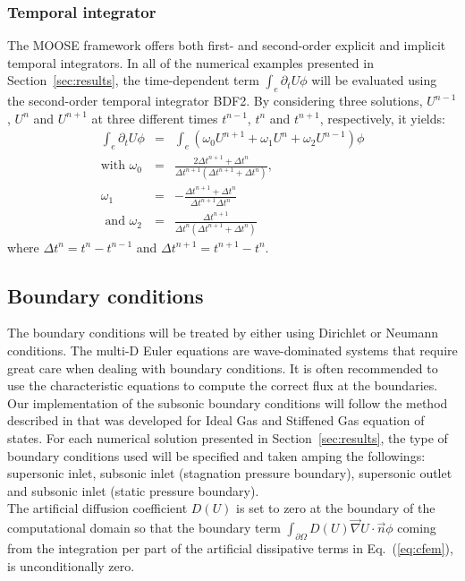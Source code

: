 \documentclass[preprint,10pt]{elsarticle}
\newcommand{\grad}{\vec{\nabla}}
\newcommand{\eqt}[1]{Eq.~(\ref{#1})}                     %
\newcommand{\sct}[1]{Section~\ref{#1}}                   %
\begin{document}
\subsubsection{Temporal integrator} 
The MOOSE framework offers both first- and second-order explicit and implicit temporal integrators. In all of the numerical examples presented in \sct{sec:results}, the time-dependent term $\int_{e} \partial_t U \phi$ will be evaluated using the second-order temporal integrator BDF2. By considering three solutions, $U^{n-1}$, $U^n$ and $U^{n+1}$ at three different times $t^{n-1}$, $t^n$ and $t^{n+1}$, respectively, it yields:
\begin{eqnarray}
\label{eq:BDF2}
\int_{e} \partial_t U \phi &=& \int_{e} \left( \omega_0 U^{n+1}  + \omega_1 U^n + \omega_2 U^{n-1} \right) \phi\\
\text{with }\omega_0 &=&\frac{2\Delta t^{n+1}+\Delta t^n}{\Delta t^{n+1} \left( \Delta t^{n+1}+\Delta t^n \right)} \text{, } \nonumber \\
\omega_1 &=& -\frac{\Delta t^{n+1}+\Delta t^n}{\Delta t^{n+1} \Delta t^n}\nonumber \\
\text{ and } \omega_2 &=& \frac{\Delta t^{n+1}}{\Delta t^n \left( \Delta t^{n+1} + \Delta t^n \right)} \nonumber
\end{eqnarray}
where $\Delta t^{n} = t^n-t^{n-1}$ and $\Delta t^{n+1} = t^{n+1}-t^{n}$.
\subsection{Boundary conditions} \label{sec:bc}
The boundary conditions will be treated by either using Dirichlet or Neumann conditions. The multi-D Euler equations are wave-dominated systems that require great care when dealing with boundary conditions. It is often recommended to use the characteristic equations to compute the correct flux at the boundaries. Our implementation of the subsonic boundary conditions will follow the method described in \cite{SEM} that was developed for Ideal Gas and Stiffened Gas equation of states. For each numerical solution presented in \sct{sec:results}, the type of boundary conditions used will be specified and taken amping the followings: supersonic inlet, subsonic inlet (stagnation pressure boundary), supersonic outlet and subsonic inlet (static pressure boundary). \\
The artificial diffusion coefficient $D(U)$ is set to zero at the boundary of the computational domain so that the boundary term $\int_{\partial \Omega} D(U) \grad U \cdot \vec{n} \phi$ coming from the integration per part of the artificial dissipative terms in \eqt{eq:cfem}, is unconditionally zero.
\end{document}
